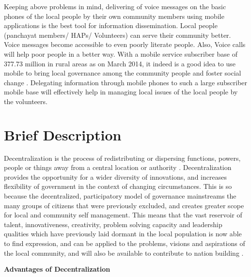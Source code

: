Keeping above problems in mind, delivering of voice messages on the basic phones of the local people by their own community members using mobile applications is the best tool for information dissemination. Local people (panchayat members/ HAPs/ Volunteers) can serve their community better.  Voice messages become accessible to even poorly literate people. Also, Voice calls will help poor people in a better way. With a mobile service subscriber base of  377.73 million in rural areas as on March 2014, it indeed is a good idea to use mobile to bring local governance among the community people and foster social change \cite{ruralpop:online}. Delegating information through mobile phones to such a  large subscriber mobile base will effectively help in managing local issues of the local people by the volunteers.

\section{Brief Description}
Decentralization is the process of redistributing or dispersing functions, powers, people or things away from a central location or authority \cite{bardhan2002decentralization}. Decentralization provides the opportunity for a wider diversity of innovations, and increases flexibility of government in the context of changing circumstances. This is so because the decentralized, participatory model of governance mainstreams the many groups of citizens that were previously excluded, and creates greater scope for local and community self management. This means that the vast reservoir of talent, innovativeness, creativity, problem solving capacity and leadership qualities which have previously laid dormant in the local population is now able to find expression, and can be applied to the problems, visions and aspirations of the local community, and will also be available to contribute to nation building \cite{Decentral:online}.

\newpage
\textbf{Advantages of Decentralization}

